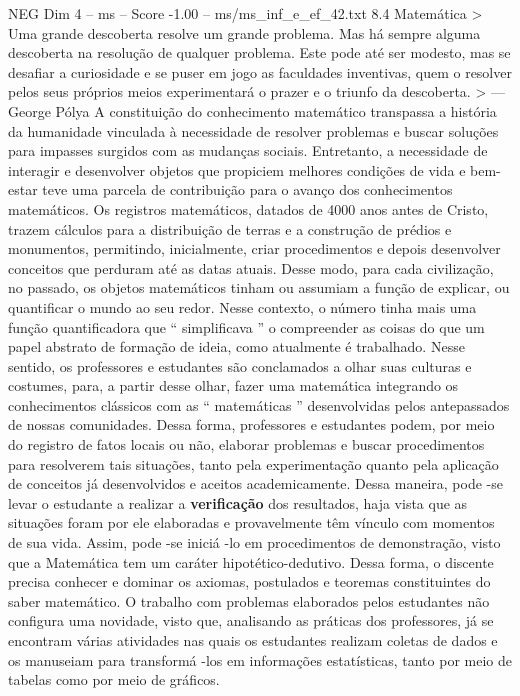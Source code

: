 \begin{textsample}{NEG Dim 4 – ms – Score -1.00 – ms/ms\_inf\_e\_ef\_42.txt}  \label{ex:f4_neg_137}
8.4 Matemática > Uma grande descoberta resolve um grande problema.
Mas há sempre alguma descoberta na resolução de qualquer problema.
Este pode até ser modesto, mas se desafiar a curiosidade e se puser em jogo as faculdades inventivas, quem o resolver pelos seus próprios meios experimentará o prazer e o triunfo da descoberta. > — George Pólya A constituição do conhecimento matemático transpassa a história da humanidade vinculada à necessidade de resolver problemas e buscar soluções para impasses surgidos com as mudanças sociais.
Entretanto, a necessidade de interagir e desenvolver objetos que propiciem melhores condições de vida e bem-estar teve uma parcela de contribuição para o avanço dos conhecimentos matemáticos.
Os registros matemáticos, datados de 4000 anos antes de Cristo, trazem cálculos para a distribuição de terras e a construção de prédios e monumentos, permitindo, inicialmente, criar procedimentos e depois desenvolver conceitos que perduram até as datas atuais.
Desse modo, para cada civilização, no passado, os objetos matemáticos tinham ou assumiam a função de explicar, ou quantificar o mundo ao seu redor.
Nesse contexto, o número tinha mais uma função quantificadora que “ simplificava ” o compreender as coisas do que um papel abstrato de formação de ideia, como atualmente é trabalhado.
Nesse sentido, os professores e estudantes são conclamados a olhar suas culturas e costumes, para, a partir desse olhar, fazer uma matemática integrando os conhecimentos clássicos com as “ matemáticas ” desenvolvidas pelos antepassados de nossas comunidades.
Dessa forma, professores e estudantes podem, por meio do registro de fatos locais ou não, elaborar problemas e buscar procedimentos para resolverem tais situações, tanto pela experimentação quanto pela aplicação de conceitos já desenvolvidos e aceitos academicamente.
Dessa maneira, pode -se levar o estudante a realizar a \textbf{verificação} dos resultados, haja vista que as situações foram por ele elaboradas e provavelmente têm vínculo com momentos de sua vida.
Assim, pode -se iniciá -lo em procedimentos de demonstração, visto que a Matemática tem um caráter hipotético-dedutivo.
Dessa forma, o discente precisa conhecer e dominar os axiomas, postulados e teoremas constituintes do saber matemático.
O trabalho com problemas elaborados pelos estudantes não configura uma novidade, visto que, analisando as práticas dos professores, já se encontram várias atividades nas quais os estudantes realizam coletas de dados e os manuseiam para transformá -los em informações estatísticas, tanto por meio de tabelas como por meio de gráficos.

\end{textsample}
